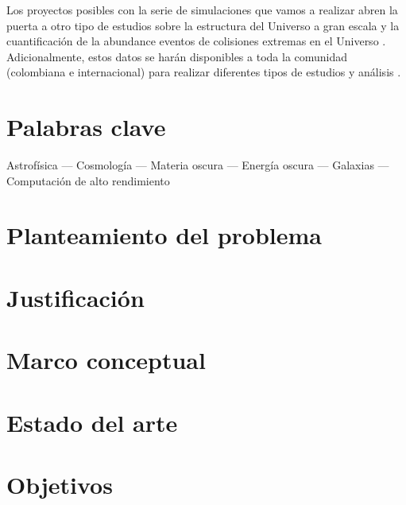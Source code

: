 \documentclass[12pt]{article}
\begin{document}
Los proyectos posibles con la serie de simulaciones que vamos a
realizar abren la puerta a otro tipo de estudios sobre la estructura
del Universo a gran escala \cite{Tweb,Vweb} y la cuantificaci\'on de
la abundance eventos de colisiones extremas en el Universo
\cite{Bullets2010,Bullets2014}. Adicionalmente, estos datos se
har\'an disponibles a toda la comunidad (colombiana e internacional)
para realizar diferentes tipos de estudios y an\'alisis \cite{Multidark}. 




\section{Palabras clave}

Astrof\'isica --- Cosmolog\'ia --- Materia oscura --- Energ\'ia oscura
--- Galaxias --- Computaci\'on de alto rendimiento 



\section{Planteamiento del problema}




\section{Justificaci\'on}

\section{Marco conceptual}


\section{Estado del arte}

\section{Objetivos}
\end{document}
